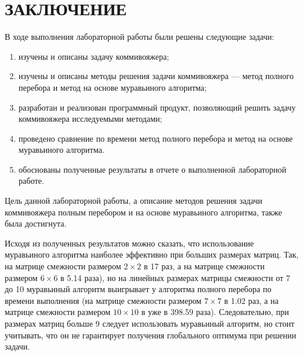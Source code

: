 \chapter*{ЗАКЛЮЧЕНИЕ}

В ходе выполнения лабораторной работы были решены следующие задачи:


\begin{enumerate}[label={\arabic*)}]
	\item изучены и описаны задачу коммивояжера;
	\item изучены и описаны методы решения задачи коммивояжера ---  метод полного перебора и метод на основе муравьиного алгоритма;
	\item разработан и реализован программный продукт, позволяющий решить задачу коммивояжера исследуемыми методами;
	\item проведено сравнение по времени метод полного перебора и метод на основе муравьиного алгоритма.
	\item обоснованы полученные результаты в отчете о выполненной лабораторной работе.
\end{enumerate}

Цель данной лабораторной работы, а описание методов решения задачи коммивояжера полным перебором и на основе муравьиного алгоритма, также была достигнута.

Исходя из полученных результатов можно сказать, что использование муравьиного алгоритма наиболее эффективно при больших размерах матриц. 
Так, на матрице смежности размером $2\times2$ в 17 раз, а на матрице смежности размером $6\times6$ в 5.14 раза), но на линейных размерах матрицы смежности от 7 до 10 муравьиный алгоритм выигрывает у алгоритма полного перебора по времени выполнения (на матрице смежности размером $7\times7$ в 1.02 раз, а на матрице смежности размером $10\times10$ в уже в 398.59 раза).
Следовательно, при размерах матриц больше 9 следует использовать муравьиный алгоритм, но стоит учитывать, что он не гарантирует получения глобального оптимума при решении задачи.
